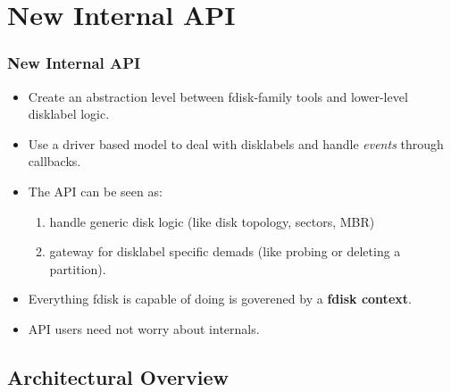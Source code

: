 
\section{New Internal API}
\begin{frame}\frametitle{New Internal API}
  \begin{itemize}
  \item Create an abstraction level between fdisk-family tools and lower-level disklabel logic.
  \item Use a driver based model to deal with disklabels and handle \emph{events} through callbacks.
  \item The API can be seen as:
    \begin{enumerate}
    \item handle generic disk logic (like disk topology, sectors, MBR)
    \item gateway for disklabel specific demads (like probing or deleting a partition).
    \end{enumerate}
  \item Everything fdisk is capable of doing is goverened by a \textbf{fdisk context}.
  \item API users need not worry about internals.
  \end{itemize}
\end{frame}

\subsection{Architectural Overview}
\begin{frame}
\end{frame}

